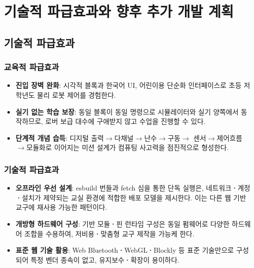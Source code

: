 \section{기술적 파급효과와 향후 추가 개발 계획}

\subsection{기술적 파급효과}

\subsubsection{교육적 파급효과}

\begin{itemize}
  \item \textbf{진입 장벽 완화}: 시각적 블록과 한국어 UI, 어린이용 단순화
        인터페이스로 초등 저학년도 물리 로봇 제어를 경험한다.
  \item \textbf{실기 없는 학습 보장}: 동일 블록이 동일 명령으로 시뮬레이터와
        실기 양쪽에서 동작하므로, 로버 보급 대수에 구애받지 않고 수업을
        진행할 수 있다.
  \item \textbf{단계적 개념 습득}: 디지털 출력$\to$다채널$\to$난수$\to$구동$\to$
        센서$\to$제어흐름$\to$모듈화로 이어지는 미션 설계가 컴퓨팅 사고력을
        점진적으로 형성한다.
\end{itemize}

\subsubsection{기술적 파급효과}

\begin{itemize}
  \item \textbf{오프라인 우선 설계}: esbuild 번들과 fetch 심을 통한 
        단독 실행은, 네트워크\textbf{·}계정\textbf{·}설치가 제약되는 교실 환경에
        적합한 배포 모델을 제시한다. 이는 다른 웹 기반 교구에 재사용 가능한
        패턴이다.
  \item \textbf{개방형 하드웨어 구성}:  기반 모듈\textbf{·}핀
        런타임 구성은 동일 펌웨어로 다양한 하드웨어 조합을 수용하여,
        저비용\textbf{·}맞춤형 교구 제작을 가능케 한다.
  \item \textbf{표준 웹 기술 활용}: Web Bluetooth\textbf{·}WebGL\textbf{·}Blockly 등
        표준 기술만으로 구성되어 특정 벤더 종속이 없고, 유지보수\textbf{·}확장이
        용이하다.
\end{itemize}

